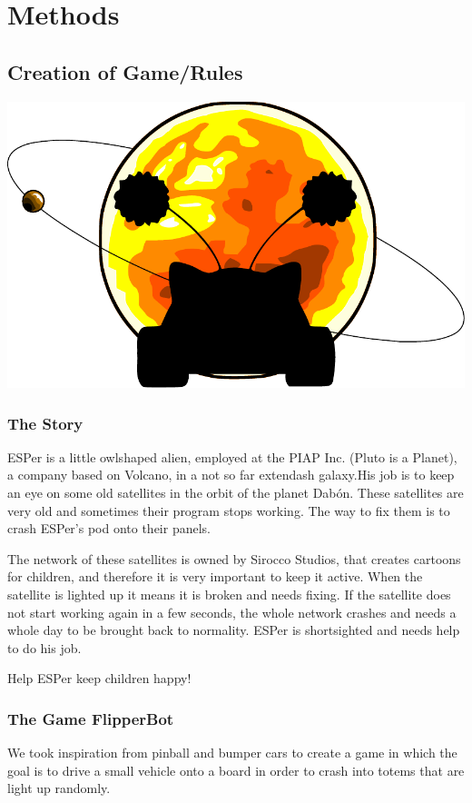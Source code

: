 \documentclass[a4paper,twoside]{book}
\begin{document}
\chapter{Methods}

\section{Creation of Game/Rules}

\includegraphics[width=\textwidth]{img/logo_finito}
\subsection{The Story}

ESPer is a little owl\textendash shaped alien, employed at the PIAP Inc. (Pluto is a Planet), a company based on Volcano, in a not so far extendash galaxy.His job is to keep an eye on some old satellites in the orbit of the planet Dab\'{o}n.
These satellites are very old and sometimes their program stops working.
The way to fix them is to crash ESPer's pod onto their panels.

The network of these satellites is owned by Sirocco Studios, that creates cartoons for children, and therefore it is very important to keep it active.
When the satellite is lighted up it means it is broken and needs fixing.
If the satellite does not start working again in a few seconds, the whole network crashes and needs a whole day to be brought back to normality.
ESPer is short\textendash sighted and needs help to do his job.

Help ESPer keep children happy!

\subsection{The Game \textendash{} FlipperBot}
We took inspiration from pinball and bumper cars to create a game in which the goal is to drive a small vehicle onto a board in order to crash into totems that are light up randomly.
\end{document}
